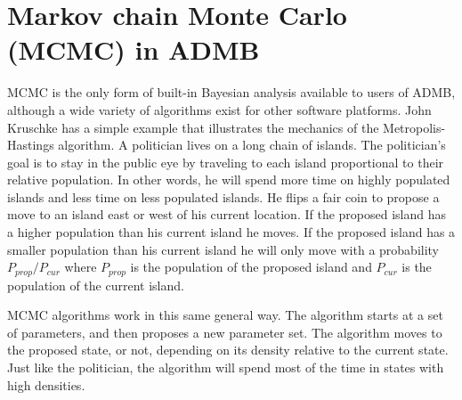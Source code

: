 \documentclass{article}\usepackage[]{graphicx}\usepackage[]{color}
\begin{document}
\section{Markov chain Monte Carlo (MCMC) in ADMB}
MCMC is the only form of built-in Bayesian analysis
available to users of ADMB, although a wide variety of
algorithms exist for other software platforms. John Kruschke
has a simple example that illustrates the mechanics of the
Metropolis-Hastings algorithm\cite{kruschke2011}. A
politician lives on a long chain of islands. The
politician's goal is to stay in the public eye by traveling
to each island proportional to their relative population. In
other words, he will spend more time on highly populated
islands and less time on less populated islands. He flips a
fair coin to propose a move to an island east or west of his
current location. If the proposed island has a higher
population than his current island he moves. If the proposed
island has a smaller population than his current island he
will only move with a probability $P_{prop} / P_{cur}$ where
$P_{prop}$ is the population of the proposed island and
$P_{cur}$ is the population of the current island.

MCMC algorithms work in this same general way. The algorithm
starts at a set of parameters, and then proposes a new
parameter set. The algorithm moves to the proposed state, or
not, depending on its density relative to the current
state. Just like the politician, the algorithm will spend
most of the time in states with high densities.
\end{document}
